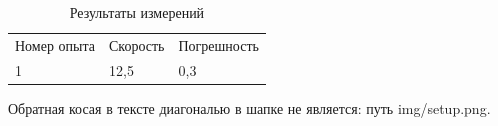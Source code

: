 \begin{table}[h]
  \caption{Результаты измерений}
  \begin{tabular}{lll}
    Номер опыта & Скорость & Погрешность \\
    1 & 12,5 & 0,3 \\
  \end{tabular}
\end{table}

Обратная косая в тексте диагональю в шапке не является: путь img/setup.png.
